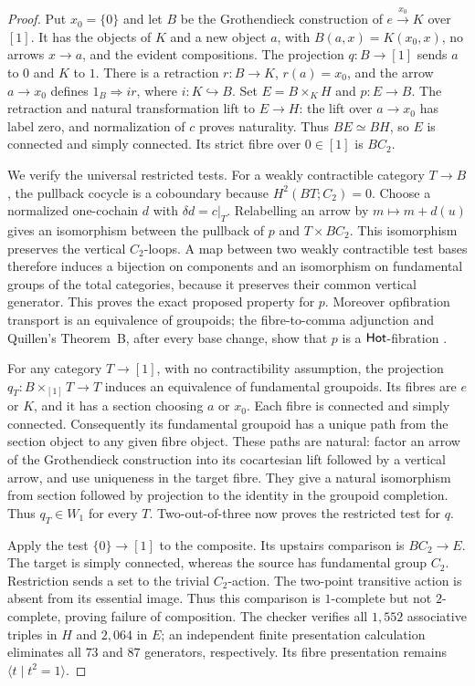 \begin{proof}
Put $x_0=\{0\}$ and let $B$ be the Grothendieck construction of $e\xrightarrow{x_0}K$ over $[1]$. It has the objects of $K$ and a new object $a$, with $B(a,x)=K(x_0,x)$, no arrows $x\to a$, and the evident compositions. The projection $q:B\to[1]$ sends $a$ to $0$ and $K$ to $1$. There is a retraction $r:B\to K$, $r(a)=x_0$, and the arrow $a\to x_0$ defines $1_B\Rightarrow ir$, where $i:K\hookrightarrow B$. Set $E=B\times_KH$ and $p:E\to B$. The retraction and natural transformation lift to $E\to H$: the lift over $a\to x_0$ has label zero, and normalization of $c$ proves naturality. Thus $BE\simeq BH$, so $E$ is connected and simply connected. Its strict fibre over $0\in[1]$ is $BC_2$.

We verify the universal restricted tests. For a weakly contractible category $T\to B$, the pullback cocycle is a coboundary because $H^2(BT;C_2)=0$. Choose a normalized one-cochain $d$ with $\delta d=c|_T$. Relabelling an arrow by $m\mapsto m+d(u)$ gives an isomorphism between the pullback of $p$ and $T\times BC_2$. This isomorphism preserves the vertical $C_2$-loops. A map between two weakly contractible test bases therefore induces a bijection on components and an isomorphism on fundamental groups of the total categories, because it preserves their common vertical generator. This proves the exact proposed property for $p$. Moreover opfibration transport is an equivalence of groupoids; the fibre-to-comma adjunction and Quillen's Theorem~B, after every base change, show that $p$ is a $\mathsf{Hot}$-fibration \citep[\S1, Theorem B and its corollary]{Quillen1973}.

For any category $T\to[1]$, with no contractibility assumption, the projection $q_T:B\times_{[1]}T\to T$ induces an equivalence of fundamental groupoids. Its fibres are $e$ or $K$, and it has a section choosing $a$ or $x_0$. Each fibre is connected and simply connected. Consequently its fundamental groupoid has a unique path from the section object to any given fibre object. These paths are natural: factor an arrow of the Grothendieck construction into its cocartesian lift followed by a vertical arrow, and use uniqueness in the target fibre. They give a natural isomorphism from section followed by projection to the identity in the groupoid completion. Thus $q_T\in W_1$ for every $T$. Two-out-of-three now proves the restricted test for $q$.

Apply the test $\{0\}\to[1]$ to the composite. Its upstairs comparison is $BC_2\to E$. The target is simply connected, whereas the source has fundamental group $C_2$. Restriction sends a set to the trivial $C_2$-action. The two-point transitive action is absent from its essential image. Thus this comparison is $1$-complete but not $2$-complete, proving failure of composition. The checker verifies all $1{,}552$ associative triples in $H$ and $2{,}064$ in $E$; an independent finite presentation calculation eliminates all $73$ and $87$ generators, respectively. Its fibre presentation remains $\langle t\mid t^2=1\rangle$.
\end{proof}

